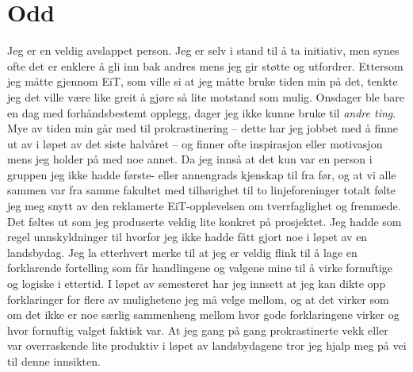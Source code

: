 \section{Odd}
Jeg er en veldig avslappet person.
Jeg er selv i stand til å ta initiativ, men synes ofte det er enklere å gli inn bak andres mens jeg gir støtte og utfordrer.
Ettersom jeg måtte gjennom EiT, som ville si at jeg måtte bruke tiden min på det, tenkte jeg det ville være like greit å gjøre så lite motstand som mulig.
Onsdager ble bare en dag med forhåndsbestemt opplegg, dager jeg ikke kunne bruke til \textit{andre ting}.
Mye av tiden min går med til prokrastinering -- dette har jeg jobbet med å finne ut av i løpet av det siste halvåret -- og finner ofte inspirasjon eller motivasjon mens jeg holder på med noe annet.
Da jeg innså at det kun var en person i gruppen jeg ikke hadde første- eller annengrads kjenskap til fra før, og at vi alle sammen var fra samme fakultet med tilhørighet til to linjeforeninger totalt følte jeg meg snytt av den reklamerte EiT-opplevelsen om tverrfaglighet og fremmede.
Det føltes ut som jeg produserte veldig lite konkret på prosjektet.
Jeg hadde som regel unnskyldninger til hvorfor jeg ikke hadde fått gjort noe i løpet av en landsbydag.
Jeg la etterhvert merke til at jeg er veldig flink til å lage en forklarende fortelling som får handlingene og valgene mine til å virke fornuftige og logiske i ettertid.
I løpet av semesteret har jeg innsett at jeg kan dikte opp forklaringer for flere av mulighetene jeg må velge mellom, og at det virker som om det ikke er noe særlig sammenheng mellom hvor gode forklaringene virker og hvor fornuftig valget faktisk var.
At jeg gang på gang prokrastinerte vekk eller var overraskende lite produktiv i løpet av landsbydagene tror jeg hjalp meg på vei til denne innsikten.
